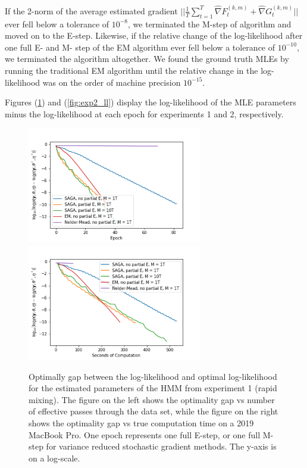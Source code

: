 If the 2-norm of the average estimated gradient $||\frac{1}{T}\sum_{t=1}^T \widehat \nabla F^{(k,m)}_t + \widehat \nabla G^{(k,m)}_t||$ ever fell below a tolerance of $10^{-8}$, we terminated the M-step of algorithm and moved on to the E-step. Likewise, if the relative change of the log-likelihood after one full E- and M- step of the EM algorithm ever fell below a tolerance of $10^{-10}$, we terminated the algorithm altogether. We found the ground truth MLEs by running the traditional EM algorithm until the relative change in the log-likelihood was on the order of machine precision $10^{-15}$.

Figures (\ref{fig:exp1_ll}) and (\ref{fig:exp2_ll}) display the log-likelihood of the MLE parameters minus the log-likelihood at each epoch for experiments 1 and 2, respectively.
%
\begin{figure}
    \centering
    \includegraphics[width=3in]{../plt/log-like_v_epoch_exp_1.png}
    \includegraphics[width=3in]{../plt/log-like_v_time_exp_1.png}
    \caption{Optimally gap between the log-likelihood and optimal log-likelihood for the estimated parameters of the HMM from experiment 1 (rapid mixing). The figure on the left shows the optimality gap vs number of effective passes through the data set, while the figure on the right shows the optimality gap vs true computation time on a 2019 MacBook Pro. One epoch represents one full E-step, or one full M-step for variance reduced stochastic gradient methods. The y-axis is on a log-scale.}
    \label{fig:exp1_ll}
\end{figure}
